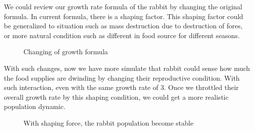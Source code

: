 \documentclass{article}
\begin{document}
\begin{normalsize}
		We could review our growth rate formula of the rabbit by changing the original formula. In current formula, there is a shaping factor. This shaping factor could be generalized to situation such as mass destruction due to destruction of fores, or more natural condition such as different in food source for different seasons.
		
		\begin{figure}[H]
			\caption{Changing of growth formula }
		\end{figure}
	
		With such changes, now we have more simulate that rabbit could sense how much the food supplies are dwinding by changing their reproductive condition. With such interaction, even with the same growth rate of 3. Once we throttled their overall growth rate by this shaping condition, we could get a more realistic population dynamic.
			\begin{figure}[H]
			\caption{With shaping force, the rabbit population become stable}
		\end{figure}
		

\end{normalsize}
\end{document}

